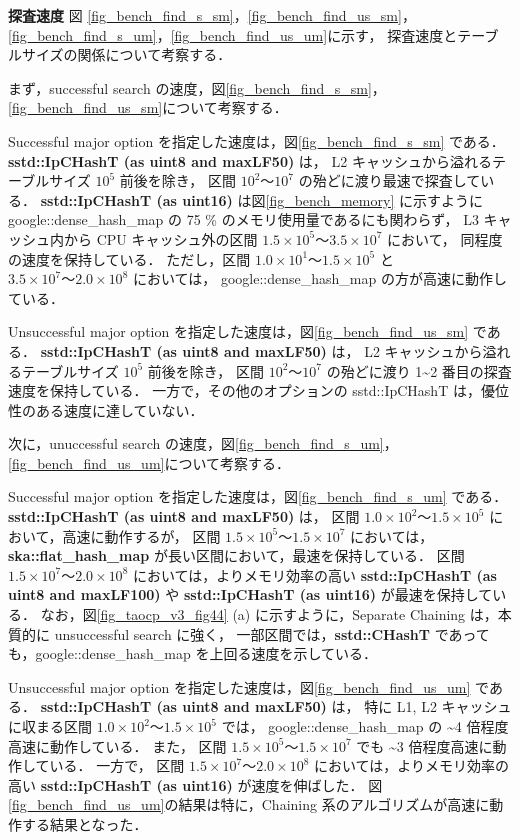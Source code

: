 %
{\bf 探査速度}
\samepage\newline\indent
図
\ref{fig_bench_find_s_sm}，\ref{fig_bench_find_us_sm}，
\ref{fig_bench_find_s_um}，\ref{fig_bench_find_us_um}に示す，
探査速度とテーブルサイズの関係について考察する．

まず，successful search の速度，図\ref{fig_bench_find_s_sm}，\ref{fig_bench_find_us_sm}について考察する．

Successful major option を指定した速度は，図\ref{fig_bench_find_s_sm} である．
{\bf sstd::IpCHashT (as uint8 and maxLF50)} は，
L2 キャッシュから溢れるテーブルサイズ $10^5$ 前後を除き，
区間 $10^2〜10^7$ の殆どに渡り最速で探査している．
{\bf sstd::IpCHashT (as uint16)} は図\ref{fig_bench_memory} に示すように
google::dense\_hash\_map の 75 \% のメモリ使用量であるにも関わらず，
L3 キャッシュ内から CPU キャッシュ外の区間 $1.5\times10^5〜3.5\times10^7$ において，
同程度の速度を保持している．
ただし，区間 $1.0\times10^1〜1.5\times10^5$ と $3.5\times10^7〜2.0\times10^8$ においては，
google::dense\_hash\_map の方が高速に動作している．

Unsuccessful major option を指定した速度は，図\ref{fig_bench_find_us_sm} である．
{\bf sstd::IpCHashT (as uint8 and maxLF50)} は，
L2 キャッシュから溢れるテーブルサイズ $10^5$ 前後を除き，
区間 $10^2〜10^7$ の殆どに渡り 1\textasciitilde 2 番目の探査速度を保持している．
一方で，その他のオプションの sstd::IpCHashT は，優位性のある速度に達していない．

次に，unuccessful search の速度，図\ref{fig_bench_find_s_um}，\ref{fig_bench_find_us_um}について考察する．

Successful major option を指定した速度は，図\ref{fig_bench_find_s_um} である．
{\bf sstd::IpCHashT (as uint8 and maxLF50)} は，
区間 $1.0\times10^2〜1.5\times10^5$ において，高速に動作するが，
区間 $1.5\times10^5〜1.5\times10^7$ においては，{\bf ska::flat\_hash\_map} が長い区間において，最速を保持している．
区間 $1.5\times10^7〜2.0\times10^8$ においては，よりメモリ効率の高い
{\bf sstd::IpCHashT (as uint8 and maxLF100)} や {\bf sstd::IpCHashT (as uint16)} が最速を保持している．
なお，図\ref{fig_taocp_v3_fig44} (a) に示すように，Separate Chaining は，本質的に unsuccessful search に強く，
一部区間では，{\bf sstd::CHashT} であっても，google::dense\_hash\_map を上回る速度を示している．

Unsuccessful major option を指定した速度は，図\ref{fig_bench_find_us_um} である．
{\bf sstd::IpCHashT (as uint8 and maxLF50)} は，
特に L1, L2 キャッシュに収まる区間 $1.0\times10^2〜1.5\times10^5$ では，
google::dense\_hash\_map の \textasciitilde4 倍程度高速に動作している．
また，
区間 $1.5\times10^5〜1.5\times10^7$ でも \textasciitilde3 倍程度高速に動作している．
一方で，
区間 $1.5\times10^7〜2.0\times10^8$ においては，よりメモリ効率の高い {\bf sstd::IpCHashT (as uint16)} が速度を伸ばした．
図\ref{fig_bench_find_us_um}の結果は特に，Chaining 系のアルゴリズムが高速に動作する結果となった．
\leavevmode \newline

